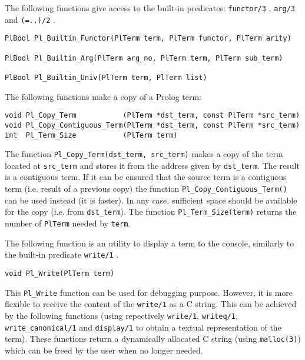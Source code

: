 The following functions give access to the built-in predicates:
\texttt{functor/3} , \texttt{arg/3} 
and \texttt{(=..)/2} .


\begin{Indentation}
\begin{verbatim}
PlBool Pl_Builtin_Functor(PlTerm term, PlTerm functor, PlTerm arity)

PlBool Pl_Builtin_Arg(PlTerm arg_no, PlTerm term, PlTerm sub_term)

PlBool Pl_Builtin_Univ(PlTerm term, PlTerm list)
\end{verbatim}
\end{Indentation}

The following functions make a copy of a Prolog term:

\begin{Indentation}
\begin{verbatim}
void Pl_Copy_Term           (PlTerm *dst_term, const PlTerm *src_term)
void Pl_Copy_Contiguous_Term(PlTerm *dst_term, const PlTerm *src_term)
int  Pl_Term_Size           (PlTerm term)
\end{verbatim}
\end{Indentation}

The function \texttt{Pl\_Copy\_Term(dst\_term, src\_term)} makes a copy of the
term located at \texttt{src\_term} and stores it from the address given by
\texttt{dst\_term}. The result is a contiguous term. If it can be ensured
that the source term is a contiguous term (i.e. result of a previous copy)
the function \texttt{Pl\_Copy\_Contiguous\_Term()} can be used instead (it is
faster). In any case, sufficient space should be available for the copy
(i.e. from \texttt{dst\_term}). The function \texttt{Pl\_Term\_Size(term)}
returns the number of \texttt{PlTerm} needed by \texttt{term}.

The following function is an utility to display a term to the console, similarly to
the built-in predicate \texttt{write/1} .

\begin{Indentation}
\begin{verbatim}
void Pl_Write(PlTerm term)
\end{verbatim}
\end{Indentation}

This \texttt{Pl\_Write} function can be used for debugging purpose. However, it is more
flexible to receive the content of the \texttt{write/1} as a C string. This can be
achieved by the following functions (using repectively \texttt{write/1},
\texttt{writeq/1}, \texttt{write\_canonical/1} and \texttt{display/1}
 to obtain a textual representation of the term). These functions
return a dynamically allocated C string (using \texttt{malloc(3)}) which can be freed
by the user when no longer needed.

